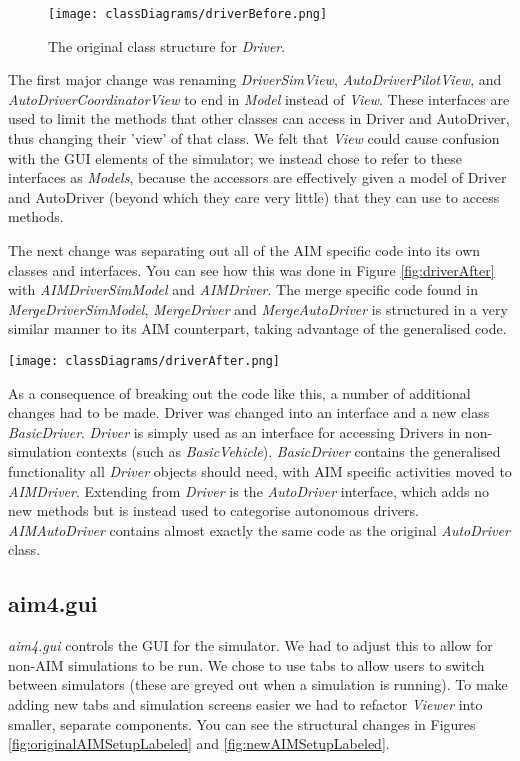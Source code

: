 \begin{appendices}
\begin{figure}[htb]
\texttt{[image: classDiagrams/driverBefore.png]}
\caption{The original class structure for \emph{Driver}.}
\label{fig:driverBefore}
\end{figure}

The first major change was renaming \emph{DriverSimView}, \emph{AutoDriverPilotView}, and \emph{AutoDriverCoordinatorView} to end in \emph{Model} instead of \emph{View}. These interfaces are used to limit the methods that other classes can access in Driver and AutoDriver, thus changing their 'view' of that class. We felt that \emph{View} could cause confusion with the GUI elements of the simulator; we instead chose to refer to these interfaces as \emph{Models}, because the accessors are effectively given a model of Driver and AutoDriver (beyond which they care very little) that they can use to access methods.

The next change was separating out all of the AIM specific code into its own classes and interfaces. You can see how this was done in Figure \ref{fig:driverAfter} with \emph{AIMDriverSimModel} and \emph{AIMDriver}. The merge specific code found in \emph{MergeDriverSimModel}, \emph{MergeDriver} and \emph{MergeAutoDriver} is structured in a very similar manner to its AIM counterpart, taking advantage of the generalised code.

\begin{sidewaysfigure}[p]
\texttt{[image: classDiagrams/driverAfter.png]}
\caption{The new class structure for \emph{Driver}.}
\label{fig:driverAfter}
\end{sidewaysfigure}

As a consequence of breaking out the code like this, a number of additional changes had to be made. Driver was changed into an interface and a new class \emph{BasicDriver}. \emph{Driver} is simply used as an interface for accessing Drivers in non-simulation contexts (such as \emph{BasicVehicle}). \emph{BasicDriver} contains the generalised functionality all \emph{Driver} objects should need, with AIM specific activities moved to \emph{AIMDriver}. Extending from \emph{Driver} is the \emph{AutoDriver} interface, which adds no new methods but is instead used to categorise autonomous drivers. \emph{AIMAutoDriver} contains almost exactly the same code as the original \emph{AutoDriver} class.

\FloatBarrier
\subsection{aim4.gui}
\label{subsec:aim4.gui}
\emph{aim4.gui} controls the GUI for the simulator. We had to adjust this to allow for non-AIM simulations to be run. We chose to use tabs to allow users to switch between simulators (these are greyed out when a simulation is running). To make adding new tabs and simulation screens easier we had to refactor \emph{Viewer} into smaller, separate components. You can see the structural changes in Figures \ref{fig:originalAIMSetupLabeled} and \ref{fig:newAIMSetupLabeled}.


\end{appendices}
